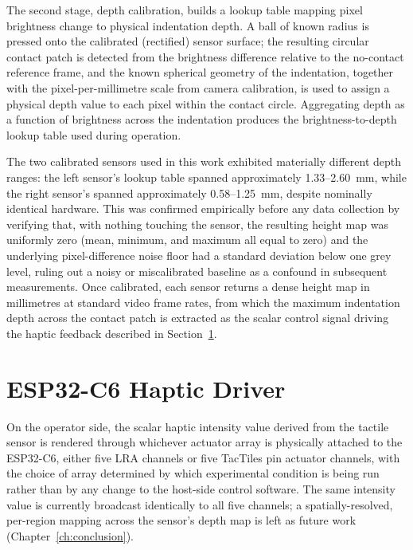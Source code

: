 \documentclass[12pt, a4paper]{report}
\begin{document}
The second stage, depth calibration, builds a lookup table mapping pixel brightness change to physical indentation depth. A ball of known radius is pressed onto the calibrated (rectified) sensor surface; the resulting circular contact patch is detected from the brightness difference relative to the no-contact reference frame, and the known spherical geometry of the indentation, together with the pixel-per-millimetre scale from camera calibration, is used to assign a physical depth value to each pixel within the contact circle. Aggregating depth as a function of brightness across the indentation produces the brightness-to-depth lookup table used during operation.

The two calibrated sensors used in this work exhibited materially different depth ranges: the left sensor's lookup table spanned approximately 1.33--2.60~mm, while the right sensor's spanned approximately 0.58--1.25~mm, despite nominally identical hardware. This was confirmed empirically before any data collection by verifying that, with nothing touching the sensor, the resulting height map was uniformly zero (mean, minimum, and maximum all equal to zero) and the underlying pixel-difference noise floor had a standard deviation below one grey level, ruling out a noisy or miscalibrated baseline as a confound in subsequent measurements. Once calibrated, each sensor returns a dense height map in millimetres at standard video frame rates, from which the maximum indentation depth across the contact patch is extracted as the scalar control signal driving the haptic feedback described in Section~\ref{sec:driver}.

\section{ESP32-C6 Haptic Driver}
\label{sec:driver}
On the operator side, the scalar haptic intensity value derived from the tactile sensor is rendered through whichever actuator array is physically attached to the ESP32-C6, either five LRA channels or five TacTiles pin actuator channels, with the choice of array determined by which experimental condition is being run rather than by any change to the host-side control software. The same intensity value is currently broadcast identically to all five channels; a spatially-resolved, per-region mapping across the sensor's depth map is left as future work (Chapter~\ref{ch:conclusion}).
\end{document}
